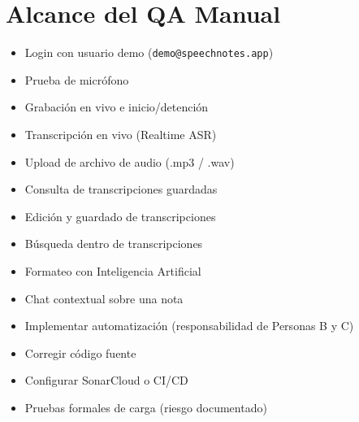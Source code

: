 \documentclass[12pt, a4paper]{article}
\begin{document}
\section{Alcance del QA Manual}

\begin{tcolorbox}[enhanced, breakable, colback=row-alt, colframe=espe-blue,
  boxrule=1pt, arc=4pt,
  title={\textbf{Flujos incluidos en la cobertura manual}}, fonttitle=\color{white},
  attach boxed title to top left={yshift=-2mm, xshift=4mm},
  boxed title style={colback=espe-blue}]
\begin{itemize}[noitemsep]
  \item Login con usuario demo (\texttt{demo@speechnotes.app})
  \item Prueba de micr\'ofono
  \item Grabaci\'on en vivo e inicio/detenci\'on
  \item Transcripci\'on en vivo (Realtime ASR)
  \item Upload de archivo de audio (.mp3 / .wav)
  \item Consulta de transcripciones guardadas
  \item Edici\'on y guardado de transcripciones
  \item B\'usqueda dentro de transcripciones
  \item Formateo con Inteligencia Artificial
  \item Chat contextual sobre una nota
\end{itemize}
\end{tcolorbox}

\vspace{0.5cm}

\begin{tcolorbox}[enhanced, colback=white, colframe=critica,
  boxrule=1pt, arc=4pt,
  title={\textbf{Fuera de alcance}}, fonttitle=\color{white},
  attach boxed title to top left={yshift=-2mm, xshift=4mm},
  boxed title style={colback=critica}]
\begin{itemize}[noitemsep]
  \item Implementar automatizaci\'on (responsabilidad de Personas B y C)
  \item Corregir c\'odigo fuente
  \item Configurar SonarCloud o CI/CD
  \item Pruebas formales de carga (riesgo documentado)
\end{itemize}
\end{tcolorbox}
\end{document}
